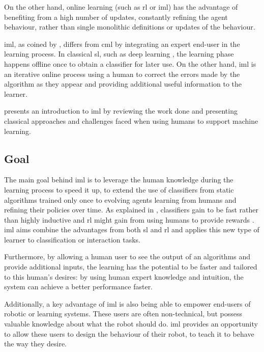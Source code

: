 On the other hand, online learning (such as \gls{rl} or \gls{iml}) has the advantage of benefiting from a high number of updates, constantly refining the agent behaviour, rather than single monolithic definitions or updates of the behaviour. 

\acrfull{iml}, as coined by \cite{fails2003interactive}, differs from \acrfull{cml} by integrating an expert end-user in the learning process. In classical \gls{sl}, such as deep learning \citep{lecun2015deep}, the learning phase happens offline once to obtain a classifier for later use. On the other hand, \gls{iml} is an iterative online process using a human to correct the errors made by the algorithm as they appear and providing additional useful information to the learner.

\cite{amershi2014power} presents an introduction to \gls{iml} by reviewing the work done and presenting classical approaches and challenges faced when using humans to support machine learning.

\subsection{Goal}

The main goal behind \gls{iml} is to leverage the human knowledge during the learning process to speed it up, to extend the use of classifiers from static algorithms trained only once to evolving agents learning from humans and refining their policies over time. As explained in \cite{fails2003interactive}, classifiers gain to be fast rather than highly inductive and \gls{rl} might gain from using humans to provide rewards \citep{knox2009interactively}. \gls{iml} aims combine the advantages from both \gls{sl} and \gls{rl} and applies this new type of learner to classification or interaction tasks.

Furthermore, by allowing a human user to see the output of an algorithms and provide additional inputs, the learning has the potential to be faster and tailored to this human's desires: by using human expert knowledge and intuition, the system can achieve a better performance faster.

Additionally, a key advantage of \gls{iml} is also being able to empower end-users of robotic or learning systems. These users are often non-technical, but possess valuable knowledge about what the robot should do. \gls{iml} provides an opportunity to allow these users to design the behaviour of their robot, to teach it to behave the way they desire.

